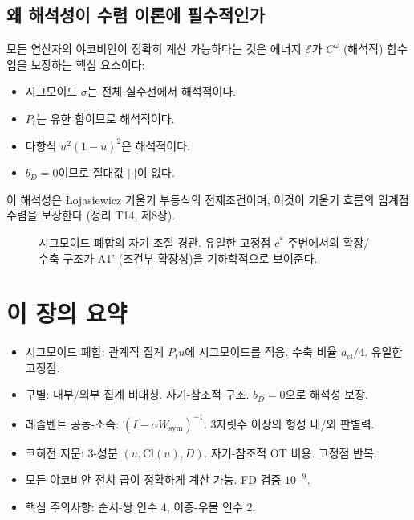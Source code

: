 \subsection{왜 해석성이 수렴 이론에 필수적인가}

모든 연산자의 야코비안이 정확히 계산 가능하다는 것은 에너지 $\mathcal{E}$가 $C^\omega$ (해석적) 함수임을 보장하는 핵심 요소이다:

\begin{itemize}
    \item 시그모이드 $\sigma$는 전체 실수선에서 해석적이다.
    \item $P_t$는 유한 합이므로 해석적이다.
    \item 다항식 $u^2(1-u)^2$은 해석적이다.
    \item $b_D = 0$이므로 절대값 $|\cdot|$이 없다.
\end{itemize}

이 해석성은 \L{}ojasiewicz 기울기 부등식의 전제조건이며, 이것이 기울기 흐름의 임계점 수렴을 보장한다 (정리 T14, 제8장).

\begin{figure}[t]
\centering
\caption{시그모이드 폐합의 자기-조절 경관. 유일한 고정점 $c^*$ 주변에서의 확장/수축 구조가 A1' (조건부 확장성)을 기하학적으로 보여준다.}
\label{fig:sigmoid-landscape}
\end{figure}


\section*{이 장의 요약}

\begin{itemize}
    \item 시그모이드 폐합: 관계적 집계 $P_t u$에 시그모이드를 적용. 수축 비율 $a_{\mathrm{cl}}/4$. 유일한 고정점.
    \item 구별: 내부/외부 집계 비대칭. 자기-참조적 구조. $b_D = 0$으로 해석성 보장.
    \item 레졸벤트 공동-소속: $(I - \alpha W_{\mathrm{sym}})^{-1}$. 3자릿수 이상의 형성 내/외 판별력.
    \item 코히전 지문: 3-성분 $(u, \mathrm{Cl}(u), D)$. 자기-참조적 OT 비용. 고정점 반복.
    \item 모든 야코비안-전치 곱이 정확하게 계산 가능. FD 검증 $10^{-9}$.
    \item 핵심 주의사항: 순서-쌍 인수 $4$, 이중-우물 인수 $2$.
\end{itemize}
